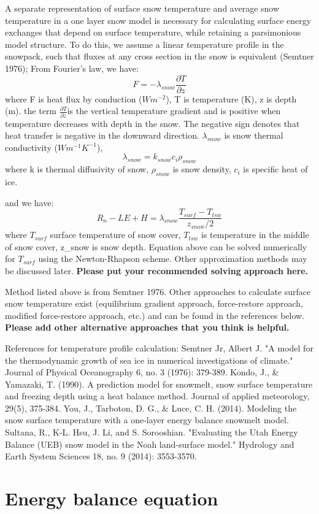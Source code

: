 \documentclass{article}
\begin{document}
A separate representation of surface snow temperature and average snow temperature in a one layer snow model is necessary for calculating surface energy exchanges that depend on surface temperature, while retaining a parsimonious model structure. To do this, we assume  a linear temperature profile in the snowpack, such that fluxes at any cross section in the snow is equivalent (Semtner 1976); From Fourier's law, we have:
\begin{equation}
F = -\lambda_{snow}\frac{\partial T}{\partial z}
\end{equation}where F is heat flux by conduction ($Wm^{-2}$), T is temperature (K), z is depth (m). the term $\frac{\partial T}{\partial z}$is the vertical temperature gradient and is positive when temperature decreases with depth in the snow. The negative sign denotes that heat transfer is negative in the downward direction. $\lambda_{snow}$ is snow thermal conductivity ($Wm^{-1}K^{-1}$),
\begin{equation}
\lambda_{snow} = k_{snow} c_i \rho_{snow}
\end{equation}
where k is thermal diffusivity of snow,  $\rho_{snow}$ is snow density, $c_i$ is specific heat of ice.

and we have:
\begin{equation}
R_n - LE + H = \lambda_{snow}\frac{T_{surf}-T_{tsw}}{z_{snow}/2}
\end{equation}where $T_{surf}$ surface temperature of snow cover, $T_{tsw}$ is temperature in the middle of snow cover, z_{snow} is snow depth.
Equation above can be solved numerically for $T_{surf}$ using the Newton-Rhapson scheme. Other approximation methods may be discussed later. \textbf{Please put your recommended solving approach here. }

Method listed above is from Semtner 1976. Other approaches to calculate surface snow temperature exist (equilibrium gradient approach, force-restore approach, modified force-restore approach, etc.) and can be found in the references below. \textbf{Please add other alternative approaches that you think is helpful.}

References for temperature profile calculation:
Semtner Jr, Albert J. "A model for the thermodynamic growth of sea ice in numerical investigations of climate." Journal of Physical Oceanography 6, no. 3 (1976): 379-389.
Kondo, J., & Yamazaki, T. (1990). A prediction model for snowmelt, snow surface temperature and freezing depth using a heat balance method. Journal of applied meteorology, 29(5), 375-384.
You, J., Tarboton, D. G., & Luce, C. H. (2014). Modeling the snow surface temperature with a one-layer energy balance snowmelt model.
Sultana, R., K-L. Hsu, J. Li, and S. Sorooshian. "Evaluating the Utah Energy Balance (UEB) snow model in the Noah land-surface model." Hydrology and Earth System Sciences 18, no. 9 (2014): 3553-3570.\section{Energy balance equation}
\end{document}
